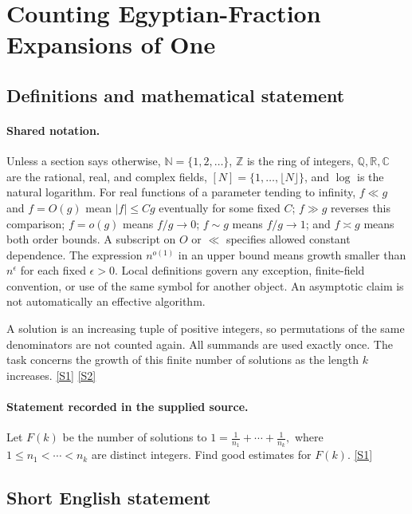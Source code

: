 \documentclass[11pt,a4paper]{article}
\newcommand{\N}{\mathbb{N}}
\newcommand{\Z}{\mathbb{Z}}
\newcommand{\Q}{\mathbb{Q}}
\newcommand{\R}{\mathbb{R}}
\newcommand{\C}{\mathbb{C}}
\newcommand{\sref}[2]{\hyperlink{source:#1:#2}{[S#2]}}
\begin{document}
\section{Counting Egyptian-Fraction Expansions of One}\label{statement}


\subsection{Definitions and mathematical statement}

\paragraph{Shared notation.}Unless a section says otherwise, $\N=\{1,2,\ldots\}$,
$\Z$ is the ring of integers, $\Q,\R,\C$ are the rational, real, and complex
fields, $[N]=\{1,\ldots,\lfloor N\rfloor\}$, and $\log$ is the natural
logarithm. For real functions of a parameter tending to infinity,
$f\ll g$ and $f=O(g)$ mean $|f|\leq Cg$ eventually for some fixed $C$;
$f\gg g$ reverses this comparison; $f=o(g)$ means $f/g\to0$;
$f\sim g$ means $f/g\to1$; and $f\asymp g$ means both order bounds.
A subscript on $O$ or $\ll$ specifies allowed constant dependence.
The expression $n^{o(1)}$ in an upper bound means growth smaller than
$n^\epsilon$ for each fixed $\epsilon>0$. Local definitions govern any
exception, finite-field convention, or use of the same symbol for another
object. An asymptotic claim is not automatically an effective algorithm.



A solution is an increasing tuple of positive integers, so permutations of the same denominators are not counted again. All summands are used exactly once. The task concerns the growth of this finite number of solutions as the length $k$ increases. \sref{statement}{1} \sref{statement}{2}

\paragraph{Statement recorded in the supplied source.}
Let $F(k)$ be the number of solutions to $  1= \frac{1}{n_1}+\cdots+\frac{1}{n_k}, $ where $1\leq n_1<\cdots<n_k$ are distinct integers. Find good estimates for $F(k)$. \sref{statement}{1}

\subsection{Short English statement}
\end{document}
